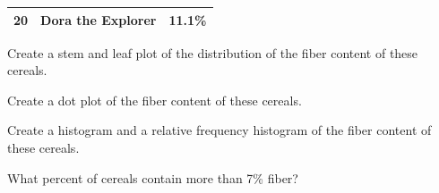 {\begin{center}
\begin{minipage}[c]{0.49\textwidth}
{\begin{tabular}{rlr}
  20 & Dora the Explorer  & 11.1\% \\ 
   \hline
\end{tabular}
}
\end{minipage}  
\end{center}
\begin{parts}
\item Create a stem and leaf plot of the distribution of the fiber content of these cereals.
\item Create a dot plot of the fiber content of these cereals.
\item Create a histogram and a relative frequency histogram of the fiber content of these cereals.
\item What percent of cereals contain more than 7\% fiber?
\end{parts}
}{}


